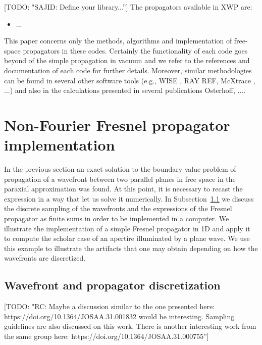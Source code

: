 \documentclass{iucr}              %
\newcommand{\todo}[1]{{\color{red}[TODO: "#1'']}}
\newcommand{\inred}[1]{{\color{red}#1}}
\begin{document}
\todo{SAJID: Define your library...}
The propagators available in XWP are: 
\begin{itemize}
    \item \inred{...}
\end{itemize}

This paper concerns only the methods, algorithms and implementation of free-space propagators in these codes. Certainly the functionality of each code goes beyond of the simple propagation in vacuum and we refer to the references and documentation of each code for further details. Moreover, similar methodologies can be found in several other software tools (e.g., WISE \cite{wise}, RAY \inred{REF}, McXtrace \cite{mcxtrace}, ...) and also in the calculations presented in several publications \inred{Osterhoff, ...}.


\section{Non-Fourier Fresnel propagator implementation}
\label{ch: non-fourier-propagators}

In the previous section an exact solution to the boundary-value problem of propagation of a wavefront between two parallel planes in free space in the paraxial approximation was found. At this point, it is necessary to recast the expression in a way that let us solve it numerically. In Subsection~\ref{subch: discretization} we discuss the discrete sampling of the wavefronts and the expressions of the Fresnel propagator as finite sums in order to be implemented in a computer. We illustrate the implementation of a simple Fresnel propagator in 1D and apply it to compute the scholar case of an apertire illuminated by a plane wave. We use this example to illustrate the artifacts that one may obtain depending on how the wavefronts are discretized.


\subsection{Wavefront and propagator discretization}
\label{subch: discretization}
\todo{RC: Maybe a discussion similar to the one presented here: https://doi.org/10.1364/JOSAA.31.001832 would be interesting. Sampling guidelines are also discussed on this work. There is another interesting work from the same group here: https://doi.org/10.1364/JOSAA.31.000755}
\end{document}

